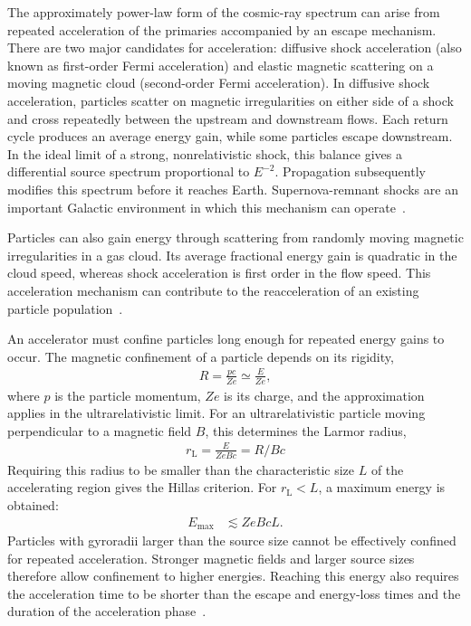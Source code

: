\documentclass[main.tex]{subfiles}
\begin{document}
The approximately power-law form of the cosmic-ray spectrum can arise from repeated acceleration of the primaries accompanied by an escape mechanism.
There are two major candidates for acceleration: diffusive shock acceleration (also known as first-order Fermi acceleration) and elastic magnetic scattering on a moving magnetic cloud (second-order Fermi acceleration).
In diffusive shock acceleration, particles scatter on magnetic irregularities on either side of a shock and cross repeatedly between the upstream and downstream flows.
Each return cycle produces an average energy gain, while some particles escape downstream.
In the ideal limit of a strong, nonrelativistic shock, this balance gives a differential source spectrum proportional to $E^{-2}$.
Propagation subsequently modifies this spectrum before it reaches Earth.
Supernova-remnant shocks are an important Galactic environment in which this mechanism can operate~\cite{Longair:2011:HighEnergyAstrohphysics,grupenAstroparticlePhysics2020}.

Particles can also gain energy through scattering from randomly moving magnetic irregularities in a gas cloud.
Its average fractional energy gain is quadratic in the cloud speed, whereas shock acceleration is first order in the flow speed.
This acceleration mechanism can contribute to the reacceleration of an existing particle population~\cite{Longair:2011:HighEnergyAstrohphysics}.

An accelerator must confine particles long enough for repeated energy gains to occur.
The magnetic confinement of a particle depends on its rigidity,
\begin{align}
    R=\frac{pc}{Ze}\simeq\frac{E}{Ze},
\end{align} where $p$ is the particle momentum, $Ze$ is its charge, and the approximation applies in the ultrarelativistic limit.
For an ultrarelativistic particle moving perpendicular to a magnetic field $B$, this determines the Larmor radius,
\begin{align}
    r_{\mathrm L}=\frac{E}{ZeBc}=R/Bc
\end{align}
Requiring this radius to be smaller than the characteristic size $L$ of the accelerating region gives the Hillas criterion. For $r_{\mathrm L}<L$, a maximum energy is obtained:
\begin{align}
    E_{\max}&\lesssim ZeBcL .
    \label{eq:cr_hillas}
\end{align}
Particles with gyroradii larger than the source size cannot be effectively confined for repeated acceleration.
Stronger magnetic fields and larger source sizes therefore allow confinement to higher energies.
Reaching this energy also requires the acceleration time to be shorter than the escape and energy-loss times and the duration of the acceleration phase~\cite{Longair:2011:HighEnergyAstrohphysics}.
\end{document}

